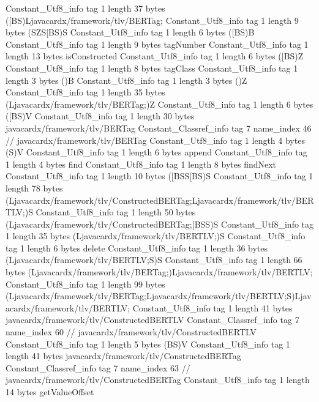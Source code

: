 {{{		}
		Constant_Utf8_info {
			tag	1
			length	37
			bytes	([BS)Ljavacardx/framework/tlv/BERTag;
		}
		Constant_Utf8_info {
			tag	1
			length	9
			bytes	(SZS[BS)S
		}
		Constant_Utf8_info {
			tag	1
			length	6
			bytes	([BS)B
		}
		Constant_Utf8_info {
			tag	1
			length	9
			bytes	tagNumber
		}
		Constant_Utf8_info {
			tag	1
			length	13
			bytes	isConstructed
		}
		Constant_Utf8_info {
			tag	1
			length	6
			bytes	([BS)Z
		}
		Constant_Utf8_info {
			tag	1
			length	8
			bytes	tagClass
		}
		Constant_Utf8_info {
			tag	1
			length	3
			bytes	()B
		}
		Constant_Utf8_info {
			tag	1
			length	3
			bytes	()Z
		}
		Constant_Utf8_info {
			tag	1
			length	35
			bytes	(Ljavacardx/framework/tlv/BERTag;)Z
		}
		Constant_Utf8_info {
			tag	1
			length	6
			bytes	([BS)V
		}
		Constant_Utf8_info {
			tag	1
			length	30
			bytes	javacardx/framework/tlv/BERTag
		}
		Constant_Classref_info {
			tag	7
			name_index	46		// javacardx/framework/tlv/BERTag
		}
		Constant_Utf8_info {
			tag	1
			length	4
			bytes	(S)V
		}
		Constant_Utf8_info {
			tag	1
			length	6
			bytes	append
		}
		Constant_Utf8_info {
			tag	1
			length	4
			bytes	find
		}
		Constant_Utf8_info {
			tag	1
			length	8
			bytes	findNext
		}
		Constant_Utf8_info {
			tag	1
			length	10
			bytes	([BSS[BS)S
		}
		Constant_Utf8_info {
			tag	1
			length	78
			bytes	(Ljavacardx/framework/tlv/ConstructedBERTag;Ljavacardx/framework/tlv/BERTLV;)S
		}
		Constant_Utf8_info {
			tag	1
			length	50
			bytes	(Ljavacardx/framework/tlv/ConstructedBERTag;[BSS)S
		}
		Constant_Utf8_info {
			tag	1
			length	35
			bytes	(Ljavacardx/framework/tlv/BERTLV;)S
		}
		Constant_Utf8_info {
			tag	1
			length	6
			bytes	delete
		}
		Constant_Utf8_info {
			tag	1
			length	36
			bytes	(Ljavacardx/framework/tlv/BERTLV;S)S
		}
		Constant_Utf8_info {
			tag	1
			length	66
			bytes	(Ljavacardx/framework/tlv/BERTag;)Ljavacardx/framework/tlv/BERTLV;
		}
		Constant_Utf8_info {
			tag	1
			length	99
			bytes	(Ljavacardx/framework/tlv/BERTag;Ljavacardx/framework/tlv/BERTLV;S)Ljavacardx/framework/tlv/BERTLV;
		}
		Constant_Utf8_info {
			tag	1
			length	41
			bytes	javacardx/framework/tlv/ConstructedBERTLV
		}
		Constant_Classref_info {
			tag	7
			name_index	60		// javacardx/framework/tlv/ConstructedBERTLV
		}
		Constant_Utf8_info {
			tag	1
			length	5
			bytes	(BS)V
		}
		Constant_Utf8_info {
			tag	1
			length	41
			bytes	javacardx/framework/tlv/ConstructedBERTag
		}
		Constant_Classref_info {
			tag	7
			name_index	63		// javacardx/framework/tlv/ConstructedBERTag
		}
		Constant_Utf8_info {
			tag	1
			length	14
			bytes	getValueOffset
}}}
